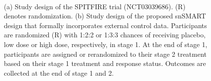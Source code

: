 \begin{figure}
\centering
{}
\\
\caption{(a) Study design of the SPITFIRE trial (NCT03039686). (R) denotes randomization. (b) Study design of the proposed \ac{snSMART} design that formally incorporates external control data. Participants are randomized (R) with 1:2:2 or 1:3:3 chances of receiving placebo, low dose or high dose, respectively, in stage 1. At the end of stage 1, participants are assigned or rerandomized to their stage 2 treatment based on their stage 1 treatment and response status. Outcomes are collected at the end of stage 1 and 2.}
\label{fig:codatasnSMART}
\end{figure}

